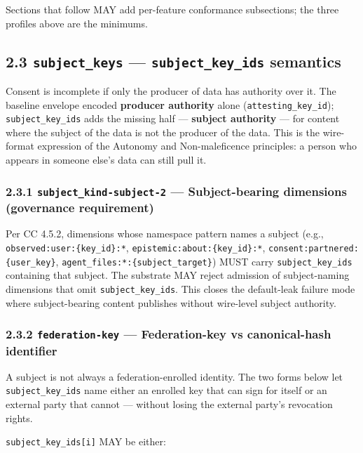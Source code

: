 \documentclass[11pt]{article}
\begin{document}
Sections that follow MAY add per-feature conformance subsections; the three profiles above are the minimums.


\subsection*{2.3 \texttt{subject\_keys} — \texttt{subject\_key\_ids} semantics}


Consent is incomplete if only the producer of data has authority over it. The baseline envelope encoded \textbf{producer authority} alone (\texttt{attesting\_key\_id}); \texttt{subject\_key\_ids} adds the missing half — \textbf{subject authority} — for content where the subject of the data is not the producer of the data. This is the wire-format expression of the Autonomy and Non-maleficence principles: a person who appears in someone else's data can still pull it.


\subsubsection*{2.3.1 \texttt{subject\_kind-subject-2} — Subject-bearing dimensions (governance requirement)}


Per CC 4.5.2, dimensions whose namespace pattern names a subject (e.g., \texttt{observed:user:\{key\_id\}:*}, \texttt{epistemic:about:\{key\_id\}:*}, \texttt{consent:partnered:\{user\_key\}}, \texttt{agent\_files:*:\{subject\_target\}}) MUST carry \texttt{subject\_key\_ids} containing that subject. The substrate MAY reject admission of subject-naming dimensions that omit \texttt{subject\_key\_ids}. This closes the default-leak failure mode where subject-bearing content publishes without wire-level subject authority.


\subsubsection*{2.3.2 \texttt{federation-key} — Federation-key vs canonical-hash identifier}


A subject is not always a federation-enrolled identity. The two forms below let \texttt{subject\_key\_ids} name either an enrolled key that can sign for itself or an external party that cannot — without losing the external party's revocation rights.


\texttt{subject\_key\_ids[i]} MAY be either:
\end{document}
